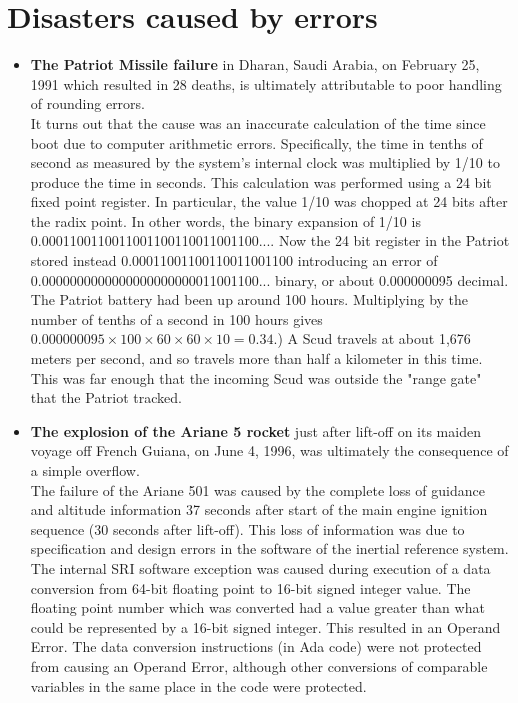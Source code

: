 \documentclass[12pt,a4paper]{extarticle}
\numberwithin{equation}{section}
\numberwithin{figure}{section}
\numberwithin{table}{section}
\theoremstyle{definition}
\begin{document}
\section{Disasters caused by errors}
\begin{itemize}
    \item {\bf The Patriot Missile failure} in Dharan, Saudi Arabia, on February 25, 1991 which resulted in 28 deaths, is ultimately attributable to poor handling of rounding errors.\cite{defense1992software}\\It turns out that the cause was an inaccurate calculation of the time since boot due to computer arithmetic errors. Specifically, the time in tenths of second as measured by the system's internal clock was multiplied by 1/10 to produce the time in seconds. This calculation was performed using a 24 bit fixed point register. In particular, the value 1/10 was chopped at 24 bits after the radix point. In other words, the binary expansion of 1/10 is 0.0001100110011001100110011001100.... Now the 24 bit register in the Patriot stored instead 0.00011001100110011001100 introducing an error of 0.0000000000000000000000011001100... binary, or about 0.000000095 decimal. The Patriot battery had been up around 100 hours. Multiplying by the number of tenths of a second in 100 hours gives $0.000000095\times 100\times 60\times 60\times 10=0.34$.) A Scud travels at about 1,676 meters per second, and so travels more than half a kilometer in this time. This was far enough that the incoming Scud was outside the "range gate" that the Patriot tracked. 
    \item {\bf The explosion of the Ariane 5 rocket} just after lift-off on its maiden voyage off French Guiana, on June 4, 1996, was ultimately the consequence of a simple overflow. \cite{lions1996ariane}\\The failure of the Ariane 501 was caused by the complete loss of guidance and altitude information 37 seconds after start of the main engine ignition sequence (30 seconds after lift-off). This loss of information was due to specification and design errors in the software of the inertial reference system.\\
    The internal SRI software exception was caused during execution of a data conversion from 64-bit floating point to 16-bit signed integer value. The floating point number which was converted had a value greater than what could be represented by a 16-bit signed integer. This resulted in an Operand Error. The data conversion instructions (in Ada code) were not protected from causing an Operand Error, although other conversions of comparable variables in the same place in the code were protected.
\end{itemize}



\end{document}
